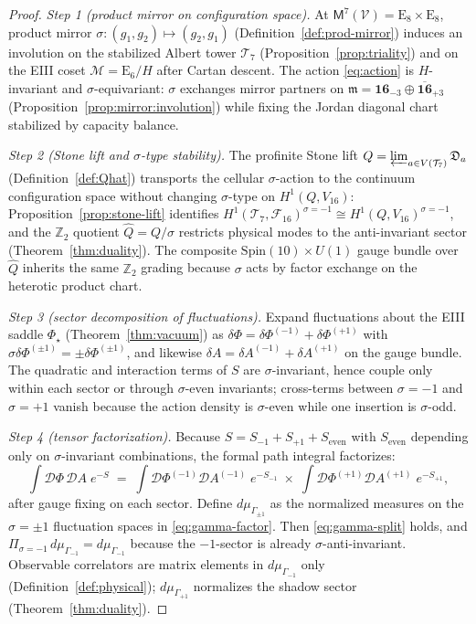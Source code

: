 \documentclass[11pt]{article}
\theoremstyle{plain}
\theoremstyle{definition}
\theoremstyle{remark}
\numberwithin{equation}{section}
\newcommand{\E}[1]{\mathrm{E}_{#1}}
\newcommand{\Spin}{\mathrm{Spin}}
\newcommand{\Void}{\mathcal{V}}
\newcommand{\Mirror}{\mathsf{M}}
\newcommand{\orderparam}{\Phi}
\begin{document}
\begin{proof}
\emph{Step 1 (product mirror on configuration space).}
At $\Mirror^7(\Void)=\E{8}\times\E{8}$, product mirror
$\sigma:(g_1,g_2)\mapsto(g_2,g_1)$
(Definition~\ref{def:prod-mirror}) induces an involution on the stabilized
Albert tower $\mathcal{T}_7$ (Proposition~\ref{prop:triality}) and on the
EIII coset $\mathcal{M}=\E{6}/H$ after Cartan descent. The action
\eqref{eq:action} is $H$-invariant and $\sigma$-equivariant: $\sigma$ exchanges
mirror partners on $\mathfrak{m}=\mathbf{16}_{-3}\oplus\overline{\mathbf{16}}_{+3}$
(Proposition~\ref{prop:mirror:involution}) while fixing the Jordan diagonal
chart stabilized by capacity balance.

\emph{Step 2 (Stone lift and $\sigma$-type stability).}
The profinite Stone lift $Q=\varprojlim_{a\in V(\mathcal{T}_7)}\mathfrak{D}_a$
(Definition~\ref{def:Qhat}) transports the cellular $\sigma$-action to the
continuum configuration space without changing $\sigma$-type on
$H^1(Q,V_{16})$: Proposition~\ref{prop:stone-lift} identifies
$H^1(\mathcal{T}_7,\mathcal{F}_{16})^{\sigma=-1}\cong
H^1(Q,V_{16})^{\sigma=-1}$, and the $\mathbb{Z}_2$ quotient
$\hat Q=Q/\sigma$ restricts physical modes to the anti-invariant sector
(Theorem~\ref{thm:duality}). The composite
$\Spin(10)\times U(1)$ gauge bundle over $\hat Q$ inherits the same
$\mathbb{Z}_2$ grading because $\sigma$ acts by factor exchange on the
heterotic product chart.

\emph{Step 3 (sector decomposition of fluctuations).}
Expand fluctuations about the EIII saddle $\orderparam_\star$
(Theorem~\ref{thm:vacuum}) as
$\delta\orderparam=\delta\orderparam^{(-1)}+\delta\orderparam^{(+1)}$ with
$\sigma\delta\orderparam^{(\pm1)}=\pm\delta\orderparam^{(\pm1)}$, and likewise
$\delta A=\delta A^{(-1)}+\delta A^{(+1)}$ on the gauge bundle.
The quadratic and interaction terms of $S$ are $\sigma$-invariant, hence
couple only within each sector or through $\sigma$-even invariants; cross-terms
between $\sigma=-1$ and $\sigma=+1$ vanish because the action density is
$\sigma$-even while one insertion is $\sigma$-odd.

\emph{Step 4 (tensor factorization).}
Because $S=S_{-1}+S_{+1}+S_{\mathrm{even}}$ with $S_{\mathrm{even}}$ depending
only on $\sigma$-invariant combinations, the formal path integral factorizes:
\begin{equation}\label{eq:gamma-factor}
  \int \mathcal{D}\orderparam\,\mathcal{D}A\;
  e^{-S}
  \;=\;
  \int \mathcal{D}\orderparam^{(-1)}\mathcal{D}A^{(-1)}\;
  e^{-S_{-1}}
  \;\times\;
  \int \mathcal{D}\orderparam^{(+1)}\mathcal{D}A^{(+1)}\;
  e^{-S_{+1}},
\end{equation}
after gauge fixing on each sector. Define $d\mu_{\Gamma_{\pm1}}$ as the
normalized measures on the $\sigma=\pm1$ fluctuation spaces in
\eqref{eq:gamma-factor}. Then \eqref{eq:gamma-split} holds, and
$\Pi_{\sigma=-1}\,d\mu_{\Gamma_{-1}}=d\mu_{\Gamma_{-1}}$ because the
$-1$-sector is already $\sigma$-anti-invariant. Observable correlators are
matrix elements in $d\mu_{\Gamma_{-1}}$ only (Definition~\ref{def:physical});
$d\mu_{\Gamma_{+1}}$ normalizes the shadow sector
(Theorem~\ref{thm:duality}).
\end{proof}
\end{document}
